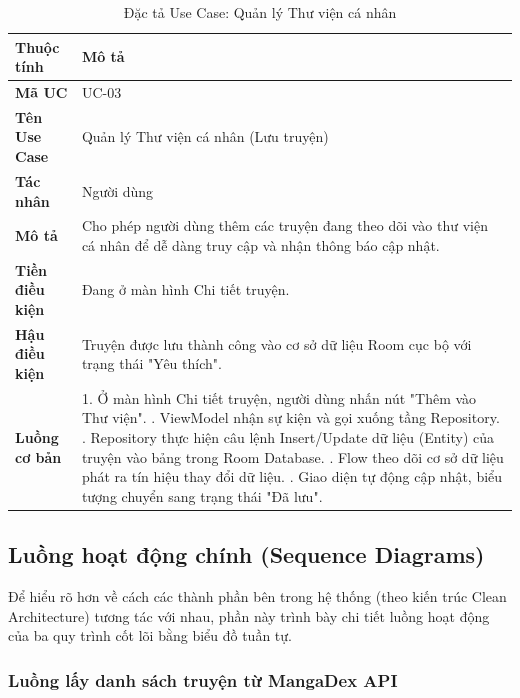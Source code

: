 \begin{table}[H]
    \centering
    \caption{Đặc tả Use Case: Quản lý Thư viện cá nhân}
    \label{tab:uc_library}
    \begin{tabular}{|p{3.5cm}|p{11.5cm}|}
    \hline
    \textbf{Thuộc tính} & \textbf{Mô tả} \\ \hline
    \textbf{Mã UC} & UC-03 \\ \hline
    \textbf{Tên Use Case} & Quản lý Thư viện cá nhân (Lưu truyện) \\ \hline
    \textbf{Tác nhân} & Người dùng \\ \hline
    \textbf{Mô tả} & Cho phép người dùng thêm các truyện đang theo dõi vào thư viện cá nhân để dễ dàng truy cập và nhận thông báo cập nhật. \\ \hline
    \textbf{Tiền điều kiện} & Đang ở màn hình Chi tiết truyện. \\ \hline
    \textbf{Hậu điều kiện} & Truyện được lưu thành công vào cơ sở dữ liệu Room cục bộ với trạng thái "Yêu thích". \\ \hline
    \textbf{Luồng cơ bản} & 
    1. Ở màn hình Chi tiết truyện, người dùng nhấn nút "Thêm vào Thư viện". \newline
    2. ViewModel nhận sự kiện và gọi xuống tầng Repository. \newline
    3. Repository thực hiện câu lệnh Insert/Update dữ liệu (Entity) của truyện vào bảng trong Room Database. \newline
    4. Flow theo dõi cơ sở dữ liệu phát ra tín hiệu thay đổi dữ liệu. \newline
    5. Giao diện tự động cập nhật, biểu tượng chuyển sang trạng thái "Đã lưu". \\ \hline
    \end{tabular}
\end{table}

\subsection{Luồng hoạt động chính (Sequence Diagrams)}

Để hiểu rõ hơn về cách các thành phần bên trong hệ thống (theo kiến trúc Clean Architecture) tương tác với nhau, phần này trình bày chi tiết luồng hoạt động của ba quy trình cốt lõi bằng biểu đồ tuần tự.

\subsubsection{Luồng lấy danh sách truyện từ MangaDex API}

